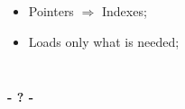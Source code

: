 \documentclass{beamer}
\begin{document}
\begin{frame}
\begin{columns}
			\smaller
			\begin{table}
				\captionsetup[subfloat]{position=top,labelformat=empty}
				\;
				\;
				\;
				\subfloat[\ldots]{}
			\end{table}
			\larger

			\begin{itemize}
				\item Pointers $\Rightarrow$ Indexes;
				\item Loads only what is needed;
			\end{itemize}
	\end{columns}
\end{frame}

\begin{frame}
\titlepage
	\begin{center}
		\Huge\bfseries
		- ? -
	\end{center}
\end{frame}
\end{document}
